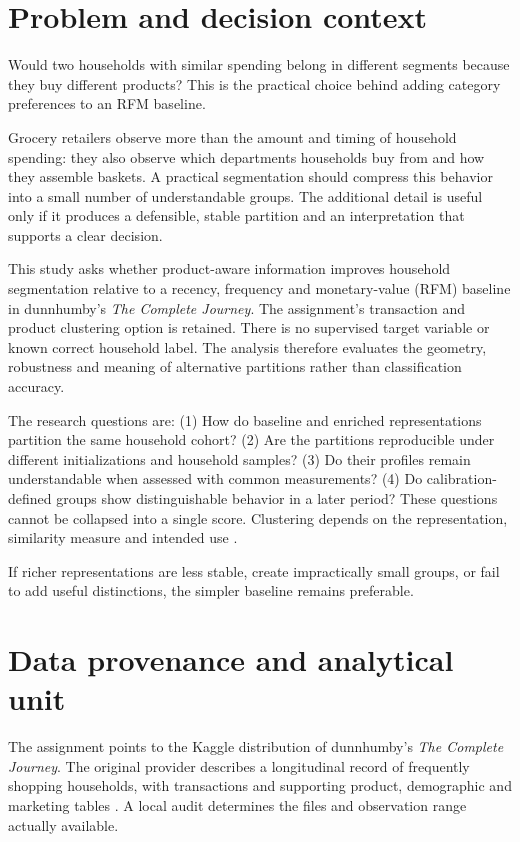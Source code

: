 \section{Problem and decision context}
Would two households with similar spending belong in different segments because they buy different products? This is the practical choice behind adding category preferences to an RFM baseline.

Grocery retailers observe more than the amount and timing of household spending: they also observe which departments households buy from and how they assemble baskets. A practical segmentation should compress this behavior into a small number of understandable groups. The additional detail is useful only if it produces a defensible, stable partition and an interpretation that supports a clear decision.

This study asks whether product-aware information improves household segmentation relative to a recency, frequency and monetary-value (RFM) baseline in dunnhumby's \emph{The Complete Journey}. The assignment's transaction and product clustering option is retained. There is no supervised target variable or known correct household label. The analysis therefore evaluates the geometry, robustness and meaning of alternative partitions rather than classification accuracy.

The research questions are: (1) How do baseline and enriched representations partition the same household cohort? (2) Are the partitions reproducible under different initializations and household samples? (3) Do their profiles remain understandable when assessed with common measurements? (4) Do calibration-defined groups show distinguishable behavior in a later period? These questions cannot be collapsed into a single score. Clustering depends on the representation, similarity measure and intended use \cite{luxburg2012context}.

If richer representations are less stable, create impractically small groups, or fail to add useful distinctions, the simpler baseline remains preferable.

\section{Data provenance and analytical unit}
The assignment points to the Kaggle distribution of dunnhumby's \emph{The Complete Journey}. The original provider describes a longitudinal record of frequently shopping households, with transactions and supporting product, demographic and marketing tables \cite{dunnhumby}. A local audit determines the files and observation range actually available.

